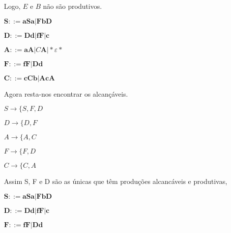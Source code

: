 \documentclass[]{article}
\begin{document}
	Logo, $E$ e $B$ não são produtivos.
	
		$\textbf{S}::=\textbf{a}\textbf{S}\textbf{a} | \textbf{F}\textbf{b}\textbf{D}$
	
	$\textbf{D}::= \textbf{D}\textbf{d} |\textbf{f}\textbf{F}|\textbf{c}$
	
	$\textbf{A}::=\textbf{a}\textbf{A}|C\textbf{A}|*\varepsilon*$
	
	$\textbf{F} ::= \textbf{f}\textbf{F} | \textbf{D}\textbf{d}$
	
	$\textbf{C} ::= \textbf{c}\textbf{Cb} | \textbf{A}\textbf{c}\textbf{A}$
	
	Agora resta-nos encontrar os alcançáveis.
	
	$S\to \{ S,F,D$
	
	$D\to \{ D, F$
	
	$A \to \{ A,C$
	
	$F \to \{ F,D$
	
	$C \to \{C, A$
	
	Assim S, F e D são as únicas que têm produções alcancáveis e produtivas,
	
			$\textbf{S}::=\textbf{a}\textbf{S}\textbf{a} | \textbf{F}\textbf{b}\textbf{D}$
	
	$\textbf{D}::= \textbf{D}\textbf{d} |\textbf{f}\textbf{F}|\textbf{c}$
	
	$\textbf{F} ::= \textbf{f}\textbf{F} | \textbf{D}\textbf{d}$
	
	
\end{document}
